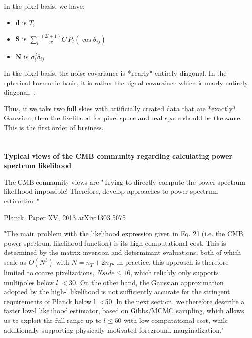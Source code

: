 \documentclass[a4paper, 11pt]{article}
\begin{document}
In the pixel basis, we have: 

\begin{itemize}
\item[]\textbf{d} is $T_i$
\item[]\textbf{S} is $\sum_{l}\frac{(2l+1)}{4\pi}C_l P_l (\cos\theta_{ij})$
\item[]\textbf{N} is $\sigma^2_i\delta_{ij}$
\end{itemize}

In the pixel basis, the noise covariance is *nearly* entirely diagonal. In the spherical harmonic basis, it is rather the signal covaraince which is nearly entirely diagonal. 
t

Thus, if we take two full skies with artificially created data that are *exactly* Gaussian, then the likelihood for pixel space and real space should be the same. This is the first order of business. 



\paragraph{} \hspace{0pt} \\


\textbf{Typical views of the CMB community regarding calculating power spectrum likelihood}

The CMB community views are "Trying to directly compute the power spectrum likelihood impossible! Therefore, develop approaches to power spectrum estimation."

Planck, Paper XV, 2013 arXiv:1303.5075

"The main problem with the likelihood expression given in Eq. 21 (i.e. the CMB power spectrum likelihood function) is its high computational cost. This is determined by the matrix inversion and determinant evaluations, both of which scale as $O(N^3)$ with $N = n_T + 2n_P$. In practice, this approach is therefore limited to coarse pixelizations, $Nside ≤ 16$, which reliably only supports multipoles below $l 􏰅<30$. On the other hand, the Gaussian approximation adopted by the high-l likelihood is not sufficiently accurate for the stringent requirements of Planck below l 􏰅<50. In the next section, we therefore describe a faster low-l likelihood estimator, based on Gibbs/MCMC sampling, which allows us to exploit the full range up to $l ≤ 50$ with low computational cost, while additionally supporting physically motivated foreground marginalization."
\end{document}
